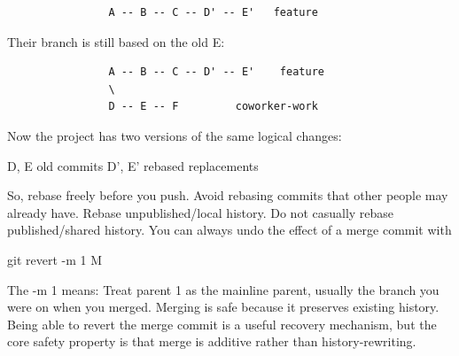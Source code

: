 \documentclass{report}
\begin{document}
\begin{itemize}
\begin{verbatim}
                A -- B -- C -- D' -- E'   feature 
            \end{verbatim}
            \bigbreak \noindent 
            Their branch is still based on the old E:
            \bigbreak \noindent 
            \begin{verbatim}
                A -- B -- C -- D' -- E'    feature
                \
                D -- E -- F         coworker-work
            \end{verbatim}
            \bigbreak \noindent 
            Now the project has two versions of the same logical changes:
            \bigbreak \noindent 
            \begin{bashcode}
                D, E      old commits
                D', E'    rebased replacements
            \end{bashcode}
            \bigbreak \noindent 
            So, rebase freely before you push. Avoid rebasing commits that other people may already have.
            \bigbreak \noindent 
            Rebase unpublished/local history. Do not casually rebase published/shared history.
            \bigbreak \noindent 
            You can always undo the effect of a merge commit with
            \bigbreak \noindent 
            \begin{bashcode}
                git revert -m 1 M
            \end{bashcode}
            \bigbreak \noindent 
            The -m 1 means: Treat parent 1 as the mainline parent, usually the branch you were on when you merged.
            \bigbreak \noindent 
            Merging is safe because it preserves existing history. Being able to revert the merge commit is a useful recovery mechanism, but the core safety property is that merge is additive rather than history-rewriting.

    \end{itemize}
\end{document}
